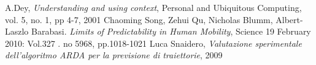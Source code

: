 \begin{thebibliography}{999}
 A.Dey, \textit{Understanding and using context}, Personal and Ubiquitous Computing, vol. 5, no. 1, pp 4-7, 2001
 Chaoming Song, Zehui Qu, Nicholas Blumm, Albert-Laszlo Barabasi. \textit{Limits of Predictability in Human Mobility}, Science 19 February 2010: Vol.327 . no 5968, pp.1018-1021
 Luca Snaidero, \textit{Valutazione sperimentale dell'algoritmo ARDA per la previsione di traiettorie}, 2009
\end{thebibliography}
